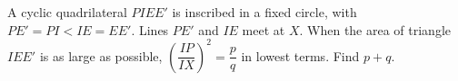 A cyclic quadrilateral $PIEE'$ is inscribed in a fixed circle, with $PE'=PI<IE=EE'$. Lines $PE'$ and $IE$ meet at $X$. When the area of triangle $IEE'$ is as large as possible, $\left(\dfrac{IP}{IX}\right)^2=\dfrac pq$ in lowest terms. Find $p+q$.
